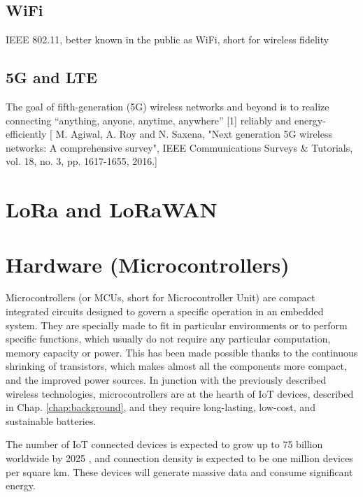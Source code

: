 	\subsection{WiFi}

	IEEE 802.11, better known in the public as WiFi, short for wireless fidelity
	
	\subsection{5G and LTE}
	
	The goal of fifth-generation (5G) wireless networks and beyond is to realize connecting “anything, anyone, anytime, anywhere” [1] reliably and energy-efficiently [ M. Agiwal, A. Roy and N. Saxena, "Next generation 5G wireless networks: A comprehensive survey", IEEE Communications Surveys \& Tutorials, vol. 18, no. 3, pp. 1617-1655, 2016.]
	

\section{LoRa and LoRaWAN}

\newpage
\newpage
	
\section{Hardware (Microcontrollers)}\label{sec:microcontrollers}

	Microcontrollers (or MCUs, short for Microcontroller Unit) are compact integrated circuits designed to govern a specific operation in an embedded system.
	They are specially made to fit in particular environments or to perform specific functions, which usually do not require any particular computation, memory capacity or power.
	This has been made possible thanks to the continuous shrinking of transistors, which makes almost all the components more compact, and the improved power sources.
	In junction with the previously described wireless technologies, microcontrollers are at the hearth of IoT devices, described in Chap. \ref{chap:background}, and they require long-lasting, low-cost, and sustainable batteries.
	
	The number of IoT connected devices is expected to grow up to 75 billion worldwide by 2025 \cite{statista}, and connection density is expected to be one million devices per square km\cite{noma}.
	These devices will generate massive data and consume significant energy.
	
